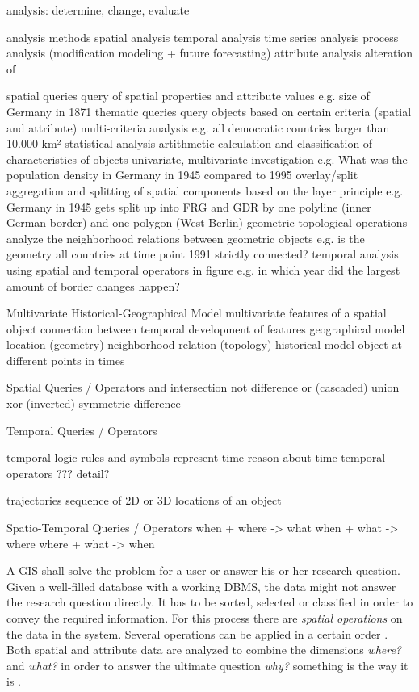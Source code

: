 analysis: determine, change, evaluate

analysis methods
  spatial analysis
  temporal analysis
    time series analysis
    process analysis      (modification modeling + future forecasting)
  attribute analysis
alteration of \cite[p. 128]{ott2001time}

spatial queries
  query of spatial properties and attribute values
  e.g. size of Germany in 1871
thematic queries
  query objects based on certain criteria (spatial and attribute)
  multi-criteria analysis
  e.g. all democratic countries larger than 10.000 km²
statistical analysis
  artithmetic calculation and classification of characteristics of objects
  univariate, multivariate investigation
  e.g. What was the population density in Germany in 1945 compared to 1995
overlay/split
  aggregation and splitting of spatial components based on the layer principle
  e.g. Germany in 1945 gets split up into FRG and GDR by one polyline (inner German border) and one polygon (West Berlin)
geometric-topological operations
  analyze the neighborhood relations between geometric objects
  e.g. is the geometry all countries at time point 1991 strictly connected?
temporal analysis
  using spatial and temporal operators in figure
  e.g. in which year did the largest amount of border changes happen?
\cite[p. 129-140]{ott2001time}

Multivariate Historical-Geographical Model
  multivariate
    features of a spatial object
    connection between temporal development of features
  geographical model
    location (geometry)
    neighborhood relation (topology)
  historical model
    object at different points in times
  \cite[p. 128]{ott2001time}

Spatial Queries / Operators
  and     intersection
  not     difference
  or      (cascaded) union
  xor     (inverted) symmetric difference

Temporal Queries / Operators

temporal logic
  rules and symbols
  represent time
  reason about time
  temporal operators
  ??? detail?

  trajectories
    sequence of 2D or 3D locations of an object

Spatio-Temporal Queries / Operators
  when + where -> what
  when + what -> where
  where + what -> when


A GIS shall solve the problem for a user or answer his or her research question. Given a well-filled database with a working DBMS, the data might not answer the research question directly. It has to be sorted, selected or classified in order to convey the required information. For this process there are \emph{spatial operations} on the data in the system. Several operations can be applied in a certain order
\cite[pp. 321-325]{bolstad2008gis}.
Both spatial and attribute data are analyzed to combine the dimensions \emph{where?} and \emph{what?} in order to answer the ultimate question \emph{why?} something is the way it is
\cite[p.xii-xvi]{knowles2002past}.

